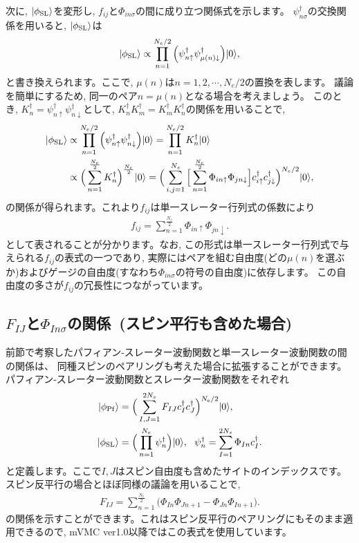 次に, $|\phi_{\rm SL}\rangle $を変形し, $f_{ij}$と$\Phi_{in\sigma}$の間に成り立つ関係式を示します。
$\psi^{\dagger}_{n\sigma}$の交換関係を用いると, $|\phi_{\rm SL}\rangle $は
\begin{align}
|\phi_{\rm SL}\rangle \propto \prod_{n=1}^{N_{e}/2}\Big(\psi_{n\uparrow}^{\dagger}\psi_{\mu(n)\downarrow}^{\dagger}\Big)|0\rangle,
\end{align}
と書き換えられます。ここで, $\mu(n)$は$n= 1, 2, \cdots, N_{e}/2$の置換を表します。
議論を簡単にするため, 同一のペア$n=\mu(n)$となる場合を考えましょう。
このとき, $K_{n}^{\dagger}=\psi_{n\uparrow}^{\dagger}\psi_{n\downarrow}^{\dagger}$として, 
$K_{n}^{\dagger}K_{m}^{\dagger}=K_{m}^{\dagger}K_{n}^{\dagger}$の関係を用いることで, 
\begin{align}
|\phi_{\rm SL}\rangle &\propto \prod_{n=1}^{N_{e}/2}\Big(\psi_{n\uparrow}^{\dagger}\psi_{n\downarrow}^{\dagger}\Big)|0\rangle
=\prod_{n=1}^{N_{e}/2} K_{n}^{\dagger}|0\rangle \\
&\propto\Big(\sum_{n=1}^{\frac{N_{e}}{2}}K_{n}^{\dagger}\Big)^{\frac{N_{e}}{2}} |0\rangle
=\Big(\sum_{i,j=1}^{N_{s}}\Big[\sum_{n=1}^{\frac{N_{e}}{2}}\Phi_{in\uparrow}\Phi_{jn\downarrow}\Big]
c_{i\uparrow}^{\dagger}c_{j\downarrow}^{\dagger}\Big)^{N_e/2}|0\rangle,
\end{align}
の関係が得られます。これより$f_{ij}$は単一スレーター行列式の係数により
\begin{align}
f_{ij}=\sum_{n=1}^{\frac{N_{e}}{2}}\Phi_{in\uparrow}\Phi_{jn\downarrow}.
\end{align}
として表されることが分かります。なお, この形式は単一スレーター行列式で与えられる$f_{ij}$の表式の一つであり, 
実際にはペアを組む自由度(どの$\mu(n)$を選ぶか)およびゲージの自由度(すなわち$\Phi_{in\sigma}$の符号の自由度)に依存します。
この自由度の多さが$f_{ij}$の冗長性につながっています。

\subsection{$F_{IJ}$と$\Phi_{In\sigma}$の関係~(スピン平行も含めた場合)}
\label{sec:PfaffianP}

前節で考察したパフィアン-スレーター波動関数と単一スレーター波動関数の間の関係は、
同種スピンのペアリングも考えた場合に拡張することができます。
パフィアン-スレーター波動関数とスレーター波動関数をそれぞれ
\begin{align}
|\phi_{\rm Pf}\rangle&=\Big(\sum_{I,J=1}^{2N_{s}}F_{IJ}c_{I}^{\dagger}c_{J}^{\dagger}\Big)^{N_{\rm e}/2}|0\rangle, \\
|\phi_{\rm SL}\rangle&=\Big(\prod_{n=1}^{N_{e}}\psi_{n}^{\dagger}\Big)|0\rangle,~~\psi_{n}^{\dagger}=\sum_{I=1}^{2N_{s}}\Phi_{In}c^{\dagger}_{I}.
\end{align}
と定義します。ここで$I,J$はスピン自由度も含めたサイトのインデックスです。
スピン反平行の場合とほぼ同様の議論を用いることで, 
\begin{align}
F_{IJ}=\sum_{n=1}^{\frac{N_{e}}{2}}\Big(\Phi_{In}\Phi_{Jn+1}-\Phi_{Jn}\Phi_{In+1}\Big).
\end{align}
の関係を示すことができます。これはスピン反平行のペアリングにもそのまま適用できるので, 
mVMC ver1.0以降ではこの表式を使用しています。

